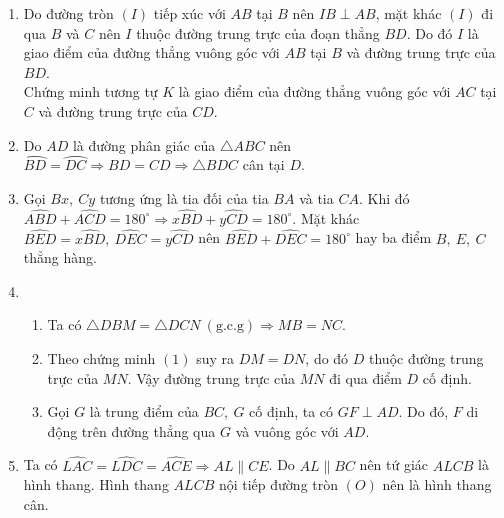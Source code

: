 \begin{bt}
{\begin{center}
\end{center}
		\begin{enumerate}
			\item Do đường tròn $(I)$ tiếp xúc với $AB$ tại $B$ nên $IB\perp AB$, mặt khác $(I)$ đi qua $B$ và $C$ nên $I$ thuộc đường trung trực của đoạn thẳng $BD$. Do đó $I$ là giao điểm của đường thẳng vuông góc với $AB$ tại $B$ và đường trung trực của $BD$.\\
			Chứng minh tương tự $K$ là giao điểm của đường thẳng vuông góc với $AC$ tại $C$ và đường trung trực của $CD$.
			\item Do $AD$ là đường phân giác của $\triangle ABC$ nên $\wideparen{BD}=\wideparen{DC}\Rightarrow BD=CD\Rightarrow\triangle BDC$ cân tại $D$.
			\item Gọi $Bx,\ Cy$ tương ứng là tia đối của tia $BA$ và tia $CA$. Khi đó $\widehat{ABD}+\widehat{ACD}=180^\circ\Rightarrow\widehat{xBD}+\widehat{yCD}=180^\circ.$ Mặt khác $\widehat{BED}=\widehat{xBD},\ \widehat{DEC}=\widehat{yCD}$ nên $\widehat{BED}+\widehat{DEC}=180^\circ$ hay ba điểm $B,\ E,\ C$ thẳng hàng.
			\item \begin{enumerate}[1)]
				\item Ta có $\triangle DBM=\triangle DCN\ (\mbox{g.c.g})\Rightarrow MB=NC.$
				\item Theo chứng minh $(1)$ suy ra $DM=DN$, do đó $D$ thuộc đường trung trực của $MN$. Vậy đường trung trực của $MN$ đi qua điểm $D$ cố định.
				\item Gọi $G$ là trung điểm của $BC,\ G$ cố định, ta có $GF\perp AD$. Do đó, $F$ di động trên đường thẳng qua $G$ và vuông góc với $AD$.
			\end{enumerate}
			\item Ta có $\widehat{LAC}=\widehat{LDC}=\widehat{ACE}\Rightarrow AL\parallel CE$. Do $AL\parallel BC$ nên tứ giác $ALCB$ là hình thang. Hình thang $ALCB$ nội tiếp đường tròn $(O)$ nên là hình thang cân.
		\end{enumerate}
	}
\end{bt}
	
